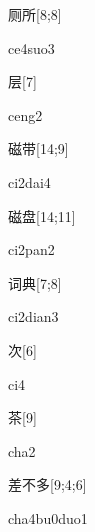 \begin{verbete}[ce4suo3]{厕所}[8;8]
\begin{pronuncia}{ce4suo3}
\end{pronuncia}
\end{verbete}

\begin{verbete}[ceng2]{层}[7]
\begin{pronuncia}{ceng2}
\end{pronuncia}
\end{verbete}

\begin{verbete}[ci2dai4]{磁带}[14;9]
\begin{pronuncia}{ci2dai4}
\end{pronuncia}
\end{verbete}

\begin{verbete}[ci2pan2]{磁盘}[14;11]
\begin{pronuncia}{ci2pan2}
\end{pronuncia}
\end{verbete}

\begin{verbete}[ci2dian3]{词典}[7;8]
\begin{pronuncia}{ci2dian3}
\end{pronuncia}
\end{verbete}

\begin{verbete}[ci4]{次}[6]
\begin{pronuncia}{ci4}
\end{pronuncia}
\end{verbete}

\begin{verbete}[cha2]{茶}[9]
\begin{pronuncia}{cha2}
\end{pronuncia}
\end{verbete}

\begin{verbete}{差不多}[9;4;6]
\begin{pronuncia}{cha4bu0duo1}
\end{pronuncia}
\end{verbete}

